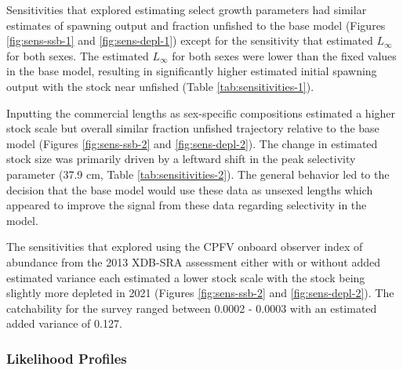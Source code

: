 \documentclass[11pt,
  english,
  a4paper,
]{article}
\begin{document}
\leavevmode\tagmcend\tagstructend\par


Sensitivities that explored estimating select growth parameters had similar estimates of spawning output and fraction unfished to the base model (Figures \ref{fig:sens-ssb-1} and \ref{fig:sens-depl-1}) except for the sensitivity that estimated {\(L_{\infty}\)\leavevmode\tagmcend\tagstructend} for both sexes. The estimated {\(L_{\infty}\)\leavevmode\tagmcend\tagstructend} for both sexes were lower than the fixed values in the base model, resulting in significantly higher estimated initial spawning output with the stock near unfished (Table \ref{tab:sensitivities-1}).

\leavevmode\tagmcend\tagstructend\par


Inputting the commercial lengths as sex-specific compositions estimated a higher stock scale but overall similar fraction unfished trajectory relative to the base model (Figures \ref{fig:sens-ssb-2} and \ref{fig:sens-depl-2}). The change in estimated stock size was primarily driven by a leftward shift in the peak selectivity parameter (37.9 cm, Table \ref{tab:sensitivities-2}). The general behavior led to the decision that the base model would use these data as unsexed lengths which appeared to improve the signal from these data regarding selectivity in the model.

\leavevmode\tagmcend\tagstructend\par


The sensitivities that explored using the CPFV onboard observer index of abundance from the 2013 XDB-SRA assessment either with or without added estimated variance each estimated a lower stock scale with the stock being slightly more depleted in 2021 (Figures \ref{fig:sens-ssb-2} and \ref{fig:sens-depl-2}). The catchability for the survey ranged between 0.0002 - 0.0003 with an estimated added variance of 0.127.

\leavevmode\tagmcend\tagstructend\par


\hypertarget{like-profiles}{%
\subsubsection{Likelihood Profiles}\label{like-profiles}}
\end{document}
